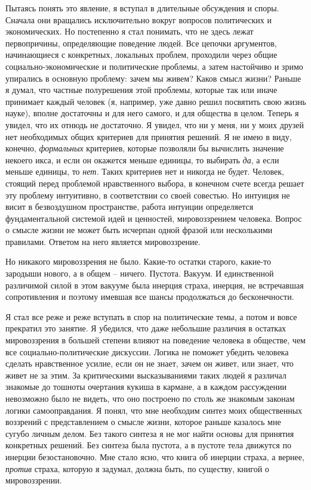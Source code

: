 \documentclass{book}
\begin{document}
Пытаясь понять это явление, я вступал в длительные обсуж­дения и споры. Сначала они вращались исключительно вокруг вопросов политических и экономических. Но постепенно я стал понимать, что не здесь лежат первопричины, определяющие поведение людей. Все цепочки аргументов, начинающиеся с конкретных, локальных проблем, проходили через общие социально-экономические и политические проблемы, а затем настойчиво и зримо упирались в основную проблему: зачем мы живем? Каков смысл жизни? Раньше я думал, что частные полурешения этой проблемы, которые так или иначе принимает каждый человек (я, например, уже давно решил посвятить свою жизнь науке), вполне достаточны и для него самого, и для общества в целом. Теперь я увидел, что их отнюдь не достаточно. Я увидел, что ни у меня, ни у моих друзей нет необходимых общих критериев для принятия решений. Я не имею в виду, конечно, \textit{формальных}  критериев, которые позволяли бы вычислить значение некоего икса, и если он окажется меньше единицы, то выбирать \textit{да},  а 
если меньше единицы,  то \textit{нет.}  Таких критериев нет и никогда не будет. Человек, стоящий перед проблемой нравственного выбора, в конечном счете всегда решает эту проблему интуитивно, в соответствии со своей совестью. Но интуиция не висит в безвоздушном пространстве, работа интуиции определяется фундаментальной системой идей и цен­ностей, мировоззрением человека. Вопрос о смысле жизни не может быть исчерпан одной фразой или несколькими правилами. Ответом на него является мировоззрение.

Но никакого мировоззрения не было. Какие-то остатки старого, какие-то зародыши нового, а в общем -- ничего. Пустота. Вакуум. И единственной различимой силой в этом вакууме была инерция страха, инерция, не встречавшая сопротивления и поэтому имевшая все шансы продолжаться до бесконечности.

Я стал все реже и реже вступать в спор на политические те­мы, а потом и вовсе прекратил это занятие. Я убедился, что да­же небольшие различия в остатках мировоззрения в большей степени влияют на поведение человека в обществе, чем все со­циально-политические дискуссии. Логика не поможет убедить человека сделать нравственное усилие, если он не знает, зачем он живет, или знает, что живет не за этим. За критическими вы­сказываниями таких людей я различал знакомые до тошноты очертания кукиша в кармане, а в каждом рассуждении невоз­можно было не видеть, что оно построено по столь же знакомым законам логики самооправдания. Я понял, что мне необходим синтез моих общественных воззрений с представлением о смыс­ле жизни, которое раньше казалось мне сугубо личным делом. Без такого синтеза я не мог найти основы для принятия кон­кретных решений. Без синтеза была пустота, а в пустоте тела движутся по инерции безостановочно. Мне стало ясно, что книга об инерции страха, а вернее, \textit{против}  страха, которую я задумал, 
должна быть, по существу, книгой о мировоззрении.
\end{document}
